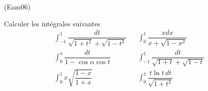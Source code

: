 \begin{tiny}(Eam06)\end{tiny}
Calculer les intégrales suivantes
\begin{align*}
 \int_{-1}^{1}\dfrac{dt}{\sqrt{1+t^2}+\sqrt{1-t^2}} & &
\int_{0}^{1}\dfrac{xdx}{x+\sqrt{1-x^2}} \\
\int_{0}^{\pi}\dfrac{dt}{1-\cos\alpha \cos t} & &
\int_{-1}^{1}\dfrac{dt}{\sqrt{1+t}+\sqrt{1-t}}\\
\int_{0}^{1}x\sqrt{\dfrac{1-x}{1+x}} & &
\int_{0}^{1}\dfrac{t\ln t \, dt}{\sqrt{1+t^2}}
\end{align*}
